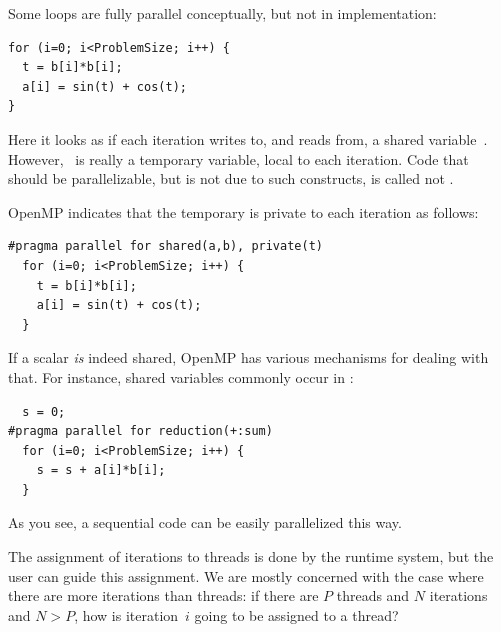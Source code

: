 Some loops are fully parallel conceptually, but not in implementation:
\begin{verbatim}
for (i=0; i<ProblemSize; i++) {
  t = b[i]*b[i];
  a[i] = sin(t) + cos(t);
}
\end{verbatim}
Here it looks as if each iteration writes to, and reads from, a shared
variable~. However, ~is really a temporary variable,
local to each iteration. Code that should be parallelizable, but is
not due to such constructs, is called not .

OpenMP indicates that the temporary is private to each iteration as follows:
\begin{verbatim}
#pragma parallel for shared(a,b), private(t)
  for (i=0; i<ProblemSize; i++) {
    t = b[i]*b[i];
    a[i] = sin(t) + cos(t);
  }
\end{verbatim}
If a scalar \emph{is} indeed shared, OpenMP has various mechanisms for
dealing with that. For instance, shared variables commonly occur in
:
\begin{verbatim}
  s = 0;
#pragma parallel for reduction(+:sum)
  for (i=0; i<ProblemSize; i++) {
    s = s + a[i]*b[i];
  }
\end{verbatim}
As you see, a sequential code can be easily parallelized this way.

The assignment of iterations to threads is done by the runtime system,
but the user can guide this assignment. We are mostly concerned with
the case where there are more iterations than threads: if there are
$P$ threads and $N$ iterations and $N>P$, how is iteration~$i$ going
to be assigned to a thread?

